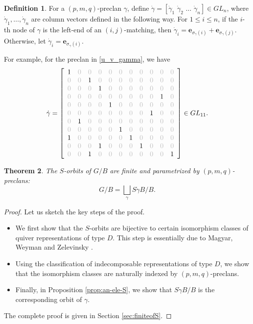 \documentclass[12pt,reqno]{amsart}
\numberwithin{equation}{section}
\newtheorem{theorem}{Theorem}[section]
\theoremstyle{definition}
\newtheorem{definition}[theorem]{Definition}
\begin{document}
\begin{definition}\label{def:dotgamma}
For a $(p,m,q)$-preclan $\gamma$, define  $\dot{\gamma}=[\dot{\gamma}_1\,\,\dot{\gamma}_2\,\, \ldots\,\, \dot{\gamma}_n]\in GL_n$, where 
$\dot{\gamma}_1,\ldots,\dot{\gamma}_n$ are  column vectors defined  in the following way.  For $1\le i\le n$, if the $i$-th node of $\gamma$ is the left-end of an $(i,j)$-matching, then 
   $\dot{\gamma}_i = \mathbf{e}_{\sigma_{\gamma}(i)}+\mathbf{e}_{\sigma_{\gamma}(j)}$. Otherwise,
let 
   $\dot{\gamma}_i = \mathbf{e}_{\sigma_{\gamma}(i)}$.
\end{definition}
For example, for the preclan in \eqref{u_v_gamma}, we have 
$$
\def\O{\color{lightgray}0}
\def\I{1}
\dot{\gamma}
=\left[\begin{array}{ccccccccccc}
\I&\O&\O&\O&\O&\O&\O&\O&\O&\O&\O\\
\O&\O&\I&\O&\O&\O&\O&\O&\O&\O&\O\\
\O&\O&\O&\I&\O&\O&\O&\O&\O&\O&\O\\
\O&\O&\O&\O&\O&\O&\O&\O&\O&\I&\O\\
\O&\O&\O&\O&\I&\O&\O&\O&\O&\O&\O\\
\O&\O&\O&\O&\O&\O&\O&\O&\I&\O&\O\\
\O&\I&\O&\O&\O&\O&\O&\O&\O&\O&\O\\
\O&\O&\O&\O&\O&\I&\O&\O&\O&\O&\O\\
\I&\O&\O&\O&\O&\O&\I&\O&\O&\O&\O\\
\O&\O&\O&\I&\O&\O&\O&\I&\O&\O&\O\\
\O&\O&\I&\O&\O&\O&\O&\O&\O&\O&\I\\
\end{array}\right]\in GL_{11}.$$

\begin{theorem}
The $S$-orbits of $G/B$ are finite and parametrized by $(p,m,q)$-preclans: 
$$G/B=\bigsqcup_{\gamma} S\dot{\gamma}B/B.$$
\end{theorem}
\begin{proof}
Let us sketch the key steps of the proof. 
\begin{itemize}
    \item We first show that the $S$-orbits are bijective to certain isomorphism classes of quiver representations of type $D$. 
    This step is essentially due to Magyar, Weyman and Zelevinsky \cite{MWZ}. 
    \item Using the classification of indecomposable representations of type $D$, we show that the isomorphism classes are naturally indexed by $(p,m,q)$-preclans. 
    \item Finally, in Proposition \ref{prop:an-ele-S}, we show that $S\dot{\gamma}B/B$ is the corresponding orbit of $\gamma$. 
\end{itemize}
The complete proof is given in Section \ref{sec:finiteofS}.  
\end{proof}
\end{document}
